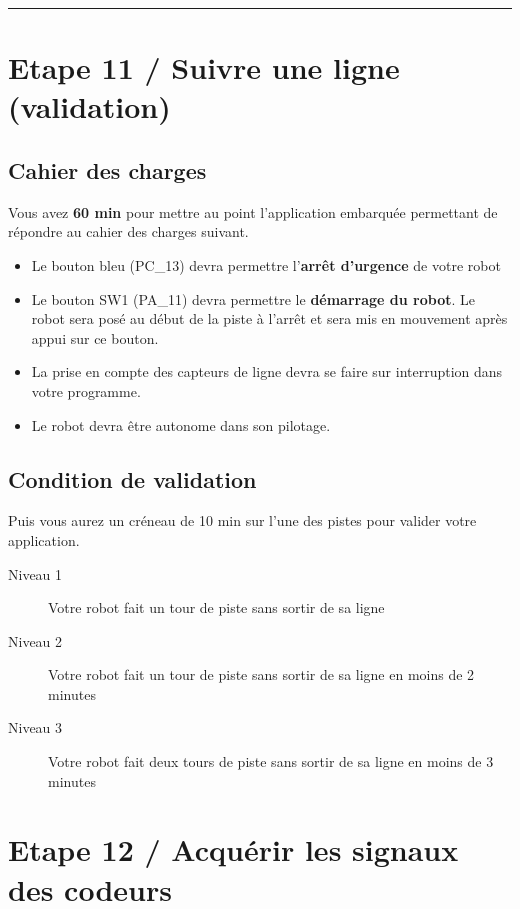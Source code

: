 \documentclass[a4paper,12pt,titlepage]{article} %
\begin{document}
\noindent \rule{\linewidth}{1pt}

\section{Etape 11 / Suivre une ligne (validation)}


\subsection{Cahier des charges}

Vous avez \textbf{60 min} pour mettre au point l'application embarquée permettant de répondre au cahier des charges suivant.


\begin{itemize}
	\item Le bouton bleu (PC\_13) devra permettre l'\textbf{arrêt d'urgence} de votre robot
	\item Le bouton SW1 (PA\_11) devra permettre le \textbf{démarrage du robot}. Le robot sera posé au début de la piste à l'arrêt et sera mis en mouvement après appui sur ce bouton.
	\item La prise en compte des capteurs de ligne devra se faire sur interruption dans votre programme.
	\item Le robot devra être autonome dans son pilotage.
\end{itemize}

\subsection{Condition de validation}

Puis vous aurez un créneau de 10 min sur l'une des pistes pour valider votre application.

\begin{description}
	\item[Niveau 1] Votre robot fait un tour de piste sans sortir de sa ligne
	\item[Niveau 2] Votre robot fait un tour de piste sans sortir de sa ligne en moins de 2 minutes
	\item[Niveau 3] Votre robot fait deux tours de piste sans sortir de sa ligne en moins de 3 minutes
\end{description}


\section{Etape 12 / Acquérir les signaux des codeurs}
\end{document}
